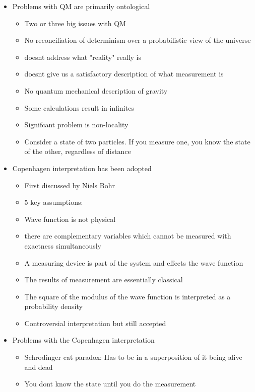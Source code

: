 \documentclass[12pt]{article}
\begin{document}
\begin{itemize}
    \item Problems with QM are primarily ontological \begin{itemize}
        \item Two or three big issues with QM
        \item No reconciliation of determinism over a probabilistic view of the universe
        \item doesnt address what "reality" really is 
        \item doesnt give us a satisfactory description of what measurement is 
        \item No quantum mechanical description of gravity
        \item Some calculations result in infinites 
        \item Signifcant problem is non-locality
        \item Consider a state of two particles. If you measure one, you know the state of the other, regardless of distance 
    \end{itemize}
    \item Copenhagen interpretation has been adopted \begin{itemize}
        \item First discussed by Niels Bohr
        \item 5 key assumptions: 
        \item Wave function is not physical
        \item there are complementary variables which cannot be measured with exactness simultaneously 
        \item A measuring device is part of the system and effects the wave function 
        \item The results of measurement are essentially classical 
        \item The square of the modulus of the wave function is interpreted as a probability density 
        \item Controversial interpretation but still accepted 
    \end{itemize}
    \item Problems with the Copenhagen interpretation \begin{itemize}
        \item Schrodinger cat paradox: Has to be in a superposition of it being alive and dead 
        \item You dont know the state until you do the measurement 

\end{itemize}
\end{itemize}
\end{document}
